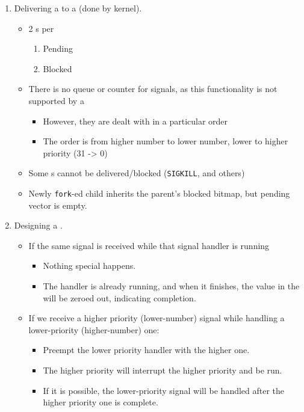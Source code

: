 \begin{enumerate}[noitemsep]
\item Delivering a  to a  (done by kernel).
  \begin{itemize}[noitemsep]
  \item 2 s per 
    \begin{enumerate}[noitemsep]
    \item Pending
    \item Blocked
    \end{enumerate}
  \item There is no queue or counter for signals, as this functionality is not supported by a 
    \begin{itemize}[noitemsep]
    \item However, they are dealt with in a particular order
    \item The order is from higher number to lower number, lower to higher priority (31 -> 0)
   \end{itemize}
  \item Some s cannot be delivered/blocked (\texttt{SIGKILL}, and others)
  \item Newly \texttt{fork}-ed child inherits the parent's blocked bitmap, but pending vector is empty.
  \end{itemize}

\item Designing a .
  \begin{itemize}[noitemsep]
  \item If the same signal is received while that signal handler is running
    \begin{itemize}[noitemsep]
    \item Nothing special happens.
    \item The handler is already running, and when it finishes, the value in the  will be zeroed out, indicating completion.
   \end{itemize}
 \item If we receive a higher priority (lower-number) signal while handling a lower-priority (higher-number) one:
   \begin{itemize}[noitemsep]
   \item Preempt the lower priority handler with the higher one.
   \item The higher priority will interrupt the higher priority and be run.
   \item If it is possible, the lower-priority signal will be handled after the higher priority one is complete.
   \end{itemize}
  \end{itemize}
\end{enumerate}

